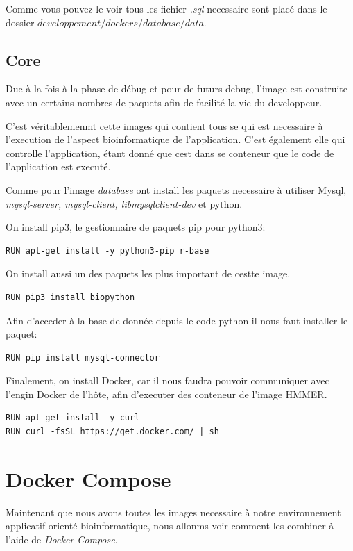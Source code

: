 Comme vous pouvez le voir tous les fichier \emph{.sql} necessaire sont placé dans le dossier \emph{$developpement/dockers/database/data$}.


\subsection{Core}
Due à la fois à la phase de débug et pour de futurs debug, l'image est construite avec un certains nombres de paquets afin de facilité la vie du developpeur.

C'est véritablemenmt cette images qui contient tous se qui est necessaire à l'execution de l'aspect bioinformatique de l'application. C'est également elle qui controlle l'application, étant donné que cest dans se conteneur que le code de l'application est executé.

Comme pour l'image \emph{database} ont install les paquets necessaire à utiliser Mysql, \emph{mysql-server, mysql-client, libmysqlclient-dev} et python.

On install pip3, le gestionnaire de paquets pip pour python3:

\begin{lstlisting}[frame=single]
RUN apt-get install -y python3-pip r-base
\end{lstlisting}

On install aussi un des paquets les plus important de cestte image.

\begin{lstlisting}[frame=single]
RUN pip3 install biopython
\end{lstlisting}

Afin d'acceder à la base de donnée depuis le code python il nous faut installer le paquet:

\begin{lstlisting}[frame=single]
RUN pip install mysql-connector
\end{lstlisting}

Finalement, on install Docker, car il nous faudra pouvoir communiquer avec l'engin Docker de l'hôte, afin d'executer des conteneur de l'image HMMER.

\begin{lstlisting}[frame=single]
RUN apt-get install -y curl
RUN curl -fsSL https://get.docker.com/ | sh
\end{lstlisting}


\section{Docker Compose}
Maintenant que nous avons toutes les images necessaire à notre environnement applicatif orienté bioinformatique, nous allonms voir comment les combiner à l'aide de \emph{Docker Compose}.

